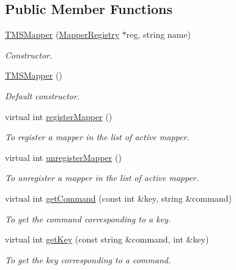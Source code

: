 \subsection*{Public Member Functions}
\begin{DoxyCompactItemize}
\item 
\hyperlink{classTMSMapper_aacd67bc9f88731c8b071c68c152b3650}{TMSMapper} (\hyperlink{classMapperRegistry}{MapperRegistry} $\ast$reg, string name)
\begin{DoxyCompactList}\small\item\em Constructor. \item\end{DoxyCompactList}\item 
\hypertarget{classTMSMapper_a7976c2a848d5abf1518ad21fa10af2d8}{
\hyperlink{classTMSMapper_a7976c2a848d5abf1518ad21fa10af2d8}{TMSMapper} ()}
\label{classTMSMapper_a7976c2a848d5abf1518ad21fa10af2d8}

\begin{DoxyCompactList}\small\item\em Default constructor. \item\end{DoxyCompactList}\item 
virtual int \hyperlink{classTMSMapper_a80861ce29842aea1375efc77cb093a17}{registerMapper} ()
\begin{DoxyCompactList}\small\item\em To register a mapper in the list of active mapper. \item\end{DoxyCompactList}\item 
virtual int \hyperlink{classTMSMapper_a0780bd57fb6ddcbf4b2b9002370d307f}{unregisterMapper} ()
\begin{DoxyCompactList}\small\item\em To unregister a mapper in the list of active mapper. \item\end{DoxyCompactList}\item 
virtual int \hyperlink{classTMSMapper_a4c101d1620d544eaa7e42c364878c6aa}{getCommand} (const int \&key, string \&command)
\begin{DoxyCompactList}\small\item\em To get the command corresponding to a key. \item\end{DoxyCompactList}\item 
virtual int \hyperlink{classTMSMapper_a943adb719ff984d5f6d9864850c3ad9d}{getKey} (const string \&command, int \&key)
\begin{DoxyCompactList}\small\item\em To get the key corresponding to a command. \item\end{DoxyCompactList}\end{DoxyCompactItemize}


